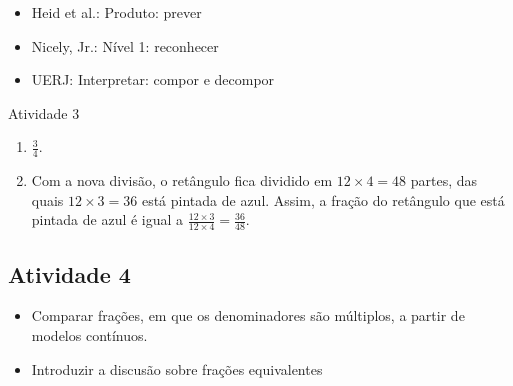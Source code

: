    \vspace{.1cm}

 \vspace{.1cm}

\begin{itemize} %
    \item       Heid et al.: Produto: prever
    \item       Nicely, Jr.: Nível 1: reconhecer
    \item       UERJ: Interpretar: compor e decompor
\end{itemize} %

\begin{resposta*}{Atividade 3}
\begin{enumerate} [\quad a)] %
    \item             $\frac{3}{4}$.
    \item       Com a nova divisão, o retângulo fica dividido em       $12
\times 4 = 48$       partes, das quais       $12 \times 3 = 36$       está
pintada de azul. Assim, a fração do retângulo que está pintada de azul é igual a
      $\frac{12 \times 3}{12 \times 4} = \frac{36}{48}$.
\end{enumerate} %

\end{resposta*}

\newpage

\subsection{Atividade 4}

\begin{itemize} %
    \item       Comparar frações, em que os denominadores são múltiplos, a
partir de modelos contínuos.
    \item       Introduzir a discusão sobre frações equivalentes
\end{itemize} %



